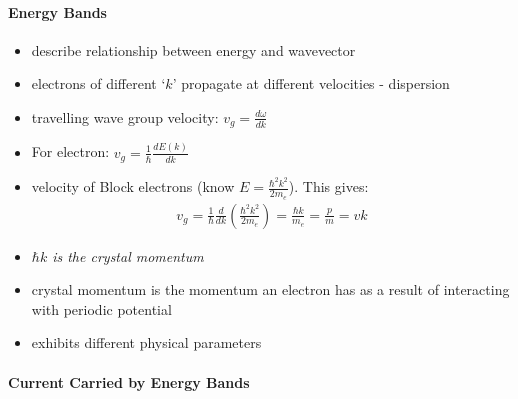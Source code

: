 \documentclass[a4paper,11pt,normalem]{article}
\begin{document}
\paragraph{Energy Bands}

\begin{itemize}
    \item describe relationship between energy and wavevector
    \item electrons of different `\(k\)' propagate at different velocities - dispersion
    \item travelling wave group velocity: $v_g = \frac{d\omega}{dk}$
    \item For electron: $v_g = \frac{1}{\hbar}\frac{dE(k)}{dk}$
    \item velocity of Block electrons (know \(E = \frac{\hbar^2k^2}{2m_e}\)). This gives:
        \begin{align*}
            v_g = \frac{1}{\hbar}\frac{d}{dk}\left(\frac{\hbar^2k^2}{2m_e}\right) = \frac{\hbar k}{m_e} = \frac{p}{m} = vk
        \end{align*}
    \item \emph{\(\hbar k\) is the crystal momentum}
    \item crystal momentum is the momentum an electron has as a result of interacting with periodic potential
    \item exhibits different physical parameters
\end{itemize}

\paragraph{Current Carried by Energy Bands}
\end{document}
